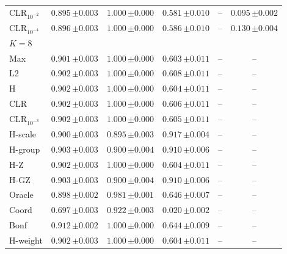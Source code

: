 \begin{tabular}{lccccc}
CLR$_{10^{-2}}$ & $0.895\,{\scriptstyle\pm 0.003}$ & $1.000\,{\scriptstyle\pm 0.000}$ & $0.581\,{\scriptstyle\pm 0.010}$ & -- & $0.095\,{\scriptstyle\pm 0.002}$ \\
CLR$_{10^{-4}}$ & $0.896\,{\scriptstyle\pm 0.003}$ & $1.000\,{\scriptstyle\pm 0.000}$ & $0.586\,{\scriptstyle\pm 0.010}$ & -- & $0.130\,{\scriptstyle\pm 0.004}$ \\
\midrule
\multicolumn{6}{l}{$K=8$} \\
Max & $0.901\,{\scriptstyle\pm 0.003}$ & $1.000\,{\scriptstyle\pm 0.000}$ & $0.603\,{\scriptstyle\pm 0.011}$ & -- & -- \\
L2 & $0.902\,{\scriptstyle\pm 0.003}$ & $1.000\,{\scriptstyle\pm 0.000}$ & $0.608\,{\scriptstyle\pm 0.011}$ & -- & -- \\
H & $0.902\,{\scriptstyle\pm 0.003}$ & $1.000\,{\scriptstyle\pm 0.000}$ & $0.604\,{\scriptstyle\pm 0.011}$ & -- & -- \\
CLR & $0.902\,{\scriptstyle\pm 0.003}$ & $1.000\,{\scriptstyle\pm 0.000}$ & $0.606\,{\scriptstyle\pm 0.011}$ & -- & -- \\
CLR$_{10^{-3}}$ & $0.902\,{\scriptstyle\pm 0.003}$ & $1.000\,{\scriptstyle\pm 0.000}$ & $0.605\,{\scriptstyle\pm 0.011}$ & -- & -- \\
H-scale & $0.900\,{\scriptstyle\pm 0.003}$ & $0.895\,{\scriptstyle\pm 0.003}$ & $0.917\,{\scriptstyle\pm 0.004}$ & -- & -- \\
H-group & $0.903\,{\scriptstyle\pm 0.003}$ & $0.900\,{\scriptstyle\pm 0.004}$ & $0.910\,{\scriptstyle\pm 0.006}$ & -- & -- \\
H-Z & $0.902\,{\scriptstyle\pm 0.003}$ & $1.000\,{\scriptstyle\pm 0.000}$ & $0.604\,{\scriptstyle\pm 0.011}$ & -- & -- \\
H-GZ & $0.903\,{\scriptstyle\pm 0.003}$ & $0.900\,{\scriptstyle\pm 0.004}$ & $0.910\,{\scriptstyle\pm 0.006}$ & -- & -- \\
Oracle & $0.898\,{\scriptstyle\pm 0.002}$ & $0.981\,{\scriptstyle\pm 0.001}$ & $0.646\,{\scriptstyle\pm 0.007}$ & -- & -- \\
Coord & $0.697\,{\scriptstyle\pm 0.003}$ & $0.922\,{\scriptstyle\pm 0.003}$ & $0.020\,{\scriptstyle\pm 0.002}$ & -- & -- \\
Bonf & $0.912\,{\scriptstyle\pm 0.002}$ & $1.000\,{\scriptstyle\pm 0.000}$ & $0.644\,{\scriptstyle\pm 0.009}$ & -- & -- \\
H-weight & $0.902\,{\scriptstyle\pm 0.003}$ & $1.000\,{\scriptstyle\pm 0.000}$ & $0.604\,{\scriptstyle\pm 0.011}$ & -- & -- \\

\end{tabular}
